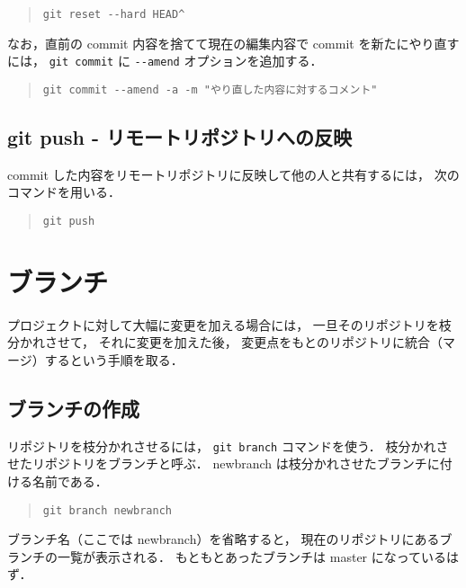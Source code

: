 \documentclass[a4j,10pt]{jarticle}
\begin{document}
\begin{quote}
\begin{verbatim}
git reset --hard HEAD^
\end{verbatim}
\end{quote}

なお，直前の commit 内容を捨てて現在の編集内容で commit を新たにやり直すには，
\verb|git commit| に \verb|--amend| オプションを追加する． 

\begin{quote}
\begin{verbatim}
git commit --amend -a -m "やり直した内容に対するコメント"
\end{verbatim}
\end{quote}

\subsection{git push - リモートリポジトリへの反映}
commit した内容をリモートリポジトリに反映して他の人と共有するには，
次のコマンドを用いる．

\begin{quote}
\begin{verbatim}
git push
\end{verbatim}
\end{quote}

\section{ブランチ}
プロジェクトに対して大幅に変更を加える場合には，
一旦そのリポジトリを枝分かれさせて，
それに変更を加えた後，
変更点をもとのリポジトリに統合（マージ）するという手順を取る．

\subsection{ブランチの作成}
リポジトリを枝分かれさせるには，
\verb|git branch| コマンドを使う．
枝分かれさせたリポジトリをブランチと呼ぶ．
newbranch は枝分かれさせたブランチに付ける名前である．

\begin{quote}
\begin{verbatim}
git branch newbranch
\end{verbatim}
\end{quote}

ブランチ名（ここでは newbranch）を省略すると，
現在のリポジトリにあるブランチの一覧が表示される．
もともとあったブランチは master になっているはず．
\end{document}
